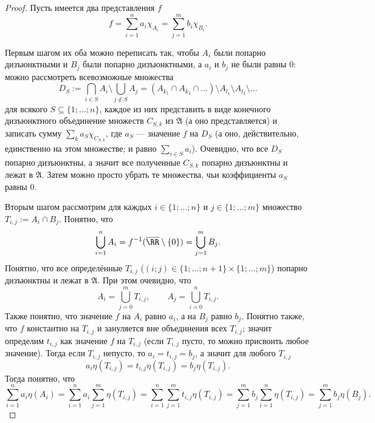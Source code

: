 \documentclass[12pt,a4paper]{article}
\begin{document}
    \begin{proof}
        Пусть имеется два представления $f$
        \[f = \sum_{i=1}^n a_i \chi_{A_i} = \sum_{j=1}^m b_i \chi_{B_i}.\]

        Первым шагом их оба можно переписать так, чтобы $A_i$ были попарно дизъюнктными и $B_j$ были попарно дизъюнктными, а $a_i$ и $b_j$ не были равны $0$: можно рассмотреть всевозможные множества
        \[
            D_S
            := \bigcap_{i \in S} A_i \setminus \bigcup_{j \notin S} A_j
            = (A_{k_1} \cap A_{k_2} \cap \dots) \setminus A_{l_1} \setminus A_{l_2} \setminus \dots
        \]
        для всякого $S \subseteq \{1; \dots; n\}$, каждое из них представить в виде конечного дизъюнктного объединение множеств $C_{S, k}$ из $\mathfrak{A}$ (а оно представляется) и записать сумму $\sum_k a_S \chi_{C_{S, k}}$, где $a_S$ --- значение $f$ на $D_S$ (а оно, действительно, единственно на этом множестве; и равно $\sum_{i \in S} a_i$). Очевидно, что все $D_S$ попарно дизъюнктны, а значит все полученные $C_{S, k}$ попарно дизъюнктны и лежат в $\mathfrak{A}$. Затем можно просто убрать те множества, чьи коэффициенты $a_S$ равны $0$.

        Вторым шагом рассмотрим для каждых $i \in \{1; \dots; n\}$ и $j \in \{1; \dots; m\}$ множество $T_{i, j} := A_i \cap B_j$. Понятно, что
        \[\bigcup_{i=1}^n A_i = f^{-1}(\overline{\RR} \setminus \{0\}) = \bigcup_{j=1}^m B_j.\]
        Понятно, что все определённые $T_{i, j}$ ($(i; j) \in \{1; \dots; n+1\} \times \{1; \dots; m\}$) попарно дизъюнктны и лежат в $\mathfrak{A}$. При этом очевидно, что
        \[
            A_i = \bigcup_{j=0}^m T_{i, j},
            \qquad
            A_j = \bigcup_{i=0}^n T_{i, j}.
        \]
        Также понятно, что значение $f$ на $A_i$ равно $a_i$, а на $B_j$ равно $b_j$. Понятно также, что $f$ константно на $T_{i, j}$ и зануляется вне объединения всех $T_{i, j}$; значит определим $t_{i, j}$ как значение $f$ на $T_{i, j}$ (если $T_{i, j}$ пусто, то можно присвоить любое значение). Тогда если $T_{i, j}$ непусто, то $a_i = t_{i, j} = b_j$, а значит для любого $T_{i, j}$
        \[a_i \eta(T_{i, j}) = t_{i, j} \eta(T_{i, j}) = b_j \eta(T_{i, j}).\]
        Тогда понятно, что
        \[
            \sum_{i=1}^n a_i \eta(A_i)
            = \sum_{i=1}^n a_i \sum_{j=1}^m \eta(T_{i, j})
            = \sum_{i=1}^n \sum_{j=1}^m t_{i, j} \eta(T_{i, j})
            = \sum_{j=1}^m b_j \sum_{i=1}^n \eta(T_{i, j})
            = \sum_{j=1}^m b_j \eta(B_j).
        \]
    \end{proof}
\end{document}
